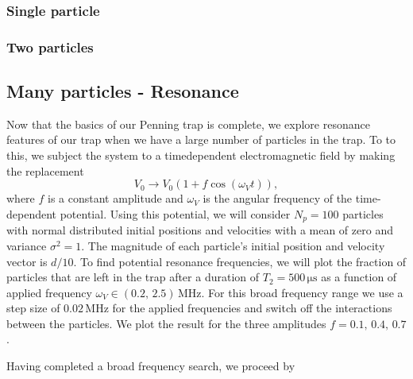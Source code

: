 \subsubsection{Single particle}

\subsubsection{Two particles}

\subsection{Many particles - Resonance}
Now that the basics of our Penning trap is complete, we explore resonance features of our trap when we have a large number of particles in the trap. To to this, we subject the system to a timedependent electromagnetic field  by making the replacement 
\begin{equation}
    V_0 \to V_0 (1 + f \cos(\omega_V t)), \label{eq:p9_time_dep_potential}
\end{equation} 
where $f$ is a constant amplitude and $\omega_V$ is the angular frequency of the time-dependent potential. Using this potential, we will consider $N_p=100$ particles with normal distributed initial positions and velocities with a mean of zero and variance $\sigma^2=1$. The magnitude of each particle's initial position and velocity vector is $d/10$. To find potential resonance frequencies, we will plot the fraction of particles that are left in the trap after a duration of $T_2=500\,\mathrm{\mu s}$ as a function of applied frequency $\omega_V\in(0.2,\,2.5)\,\mathrm{MHz}$. For this broad frequency range we use a step size of $0.02\,\mathrm{MHz}$ for the applied frequencies and switch off the interactions between the particles. We plot the result for the three amplitudes $f=0.1,\,0.4,\,0.7$. 


Having completed a broad frequency search, we proceed by 



































